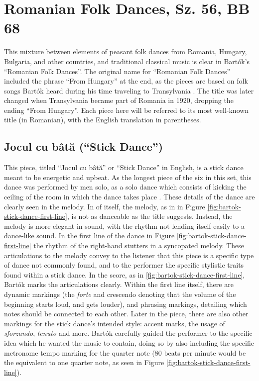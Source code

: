 \section{Romanian Folk Dances, Sz. 56, BB 68}

This mixture between elements of peasant folk dances from Romania, Hungary, Bulgaria, and other countries, and traditional classical music is clear in Bartók's ``Romanian Folk Dances''. The original name for ``Romanian Folk Dances'' included the phrase ``From Hungary'' at the end, as the pieces are based on folk songs Bartók heard during his time traveling to Transylvania \autocite{Burkholder_Grout_Palisca_2014}. The title was later changed when Transylvania became part of Romania in 1920, dropping the ending ``From Hungary''. Each piece here will be referred to its most well-known title (in Romanian), with the English translation in parentheses.

\subsection{Jocul cu bâtă (``Stick Dance'')}

This piece, titled ``Jocul cu bâtă'' or ``Stick Dance'' in English, is a stick dance meant to be energetic and upbeat. As the longest piece of the six in this set, this dance was performed by men solo, as a solo dance which consists of kicking the ceiling of the room in which the dance takes place \autocite{Weissmann_1969}. These details of the dance are clearly seen in the melody. In of itself, the melody, as in  in Figure \ref{fig:bartok-stick-dance-first-line}\autocite{Lung_2016}, is not as danceable as the title suggests. Instead, the melody is more elegant in sound, with the rhythm not lending itself easily to a dance-like sound. In the first line of the dance in Figure \ref{fig:bartok-stick-dance-first-line}\autocite{Lung_2016} the rhythm of the right-hand stutters in a syncopated melody. These articulations to the melody convey to the listener that this piece is a specific type of dance not commonly found, and to the performer the specific stylistic traits found within a stick dance. In the score, as in \ref{fig:bartok-stick-dance-first-line}\autocite{Lung_2016}, Bartók marks the articulations clearly. Within the first line itself, there are dynamic markings (the \textit{forte} and crescendo denoting that the volume of the beginning starts loud, and gets louder), and phrasing markings, detailing which notes should be connected to each other. Later in the piece, there are also other markings for the stick dance's intended style: accent marks, the usage of \textit{sforzando}, \textit{tenuto} and more. Bartók carefully guided the performer to the specific idea which he wanted the music to contain, doing so by also including the specific metronome tempo marking for the quarter note (80 beats per minute would be the equivalent to one quarter note, as seen in Figure \ref{fig:bartok-stick-dance-first-line}\autocite{Lung_2016}).

